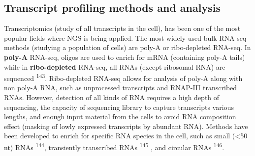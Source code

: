 \documentclass[11pt,twoside]{MPIthesis}
\theoremstyle{definition}
\theoremstyle{definition}
\theoremstyle{definition}
\theoremstyle{remark}
\begin{document}
\subsection{Transcript profiling methods and
analysis}\label{transcript-profiling-methods-and-analysis}

Transcriptomics (study of all transcripts in the cell), has been one of
the most popular fields where NGS is being applied. The most widely used
bulk RNA-seq methods (studying a population of cells) are poly-A or
ribo-depleted RNA-seq. In \textbf{poly-A} RNA-seq, oligos are used to
enrich for mRNA (containing poly-A tails) while in
\textbf{ribo-depleted} RNA-seq, all RNAs (except ribosomal RNA) are
sequenced \textsuperscript{143}. Ribo-depleted RNA-seq allows for
analysis of poly-A along with non poly-A RNA, such as unprocessed
transcripts and RNAP-III transcribed RNAs. However, detection of all
kinds of RNA requires a high depth of sequencing, the capacity of
sequencing library to capture transcripts various lengths, and enough
input material from the cells to avoid RNA composition effect (masking
of lowly expressed transcripts by abundant RNA). Methods have been
developed to enrich for specific RNA species in the cell, such as small
(\textless{}50 nt) RNAs \textsuperscript{144}, transiently transcribed
RNAs \textsuperscript{145} , and circular RNAs \textsuperscript{146}.
\end{document}
